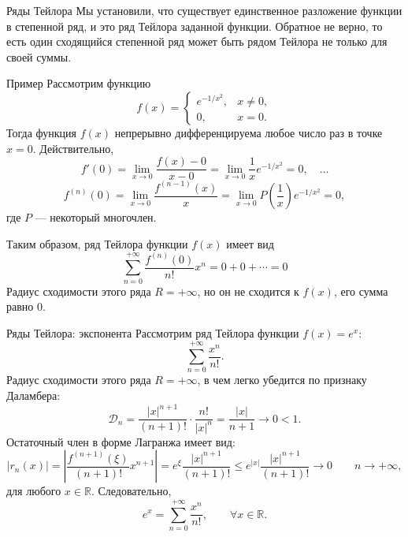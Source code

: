 \documentclass[8pt]{beamer}
\begin{document}
\begin{frame}{Ряды Тейлора}
Мы установили, что существует единственное разложение функции в степенной ряд, и это ряд Тейлора заданной функции. Обратное не верно, то есть один сходящийся степенной ряд может быть рядом Тейлора не только для своей суммы.

\begin{block}{Пример}
Рассмотрим функцию
$$f(x) = \left\{ \begin{array}{ll}
e^{-1/x^2},&x\ne 0,\\
0,& x=0.
\end{array}\right.
$$
Тогда функция $f(x)$ непрерывно дифференцируема любое число раз в точке $x=0$. Действительно,
$$f'(0) = \lim_{x\to0} \frac{f(x) -0}{x-0} = \lim_{x\to0}\frac{1}{x}e^{-1/x^2} = 0,\quad\ldots$$
$$ f^{(n)}(0) = \lim_{x\to0}\frac{f^{(n-1)}(x)}{x} = \lim_{x\to0} P\left(\frac{1}{x}\right) e^{-1/x^2} = 0,$$
где $P$ --- некоторый многочлен.
\end{block}
Таким образом, ряд Тейлора функции $f(x)$ имеет вид
$$\sum_{n=0}^{+\infty}\frac{f^{(n)}(0)}{n!}x^n = 0+0+\cdots = 0$$
Радиус сходимости этого ряда $R=+\infty$, но он не сходится к $f(x)$, его сумма равно 0.
\end{frame}



\begin{frame}{Ряды Тейлора: экспонента}
Рассмотрим ряд Тейлора функции $ f(x) = e^x$:
$$\sum_{n=0}^{+\infty}\frac{x^n}{n!}.$$
Радиус сходимости этого ряда $R = +\infty$, в чем легко убедится по признаку Даламбера:
$$\mathcal{D}_n =\frac{|x|^{n+1}}{(n+1)!}\cdot\frac{n!}{|x|^n} = \frac{|x|}{n+1}\to0<1.$$
Остаточный член в форме Лагранжа имеет вид:
$$|r_n(x)| = \left| \frac{f^{(n+1)}(\xi)}{(n+1)!}x^{n+1} \right| =e^\xi \frac{|x|^{n+1}}{(n+1)!}\le e^{|x|}\frac{|x|^{n+1}}{(n+1)!} \to0 
\qquad n\to+\infty,$$
для любого $x\in\mathbb{R}$. Следовательно,
$$e^x =\sum_{n=0}^{+\infty}\frac{x^n}{n!},\qquad \forall x\in\mathbb{R}.$$
\end{frame}
\end{document}
